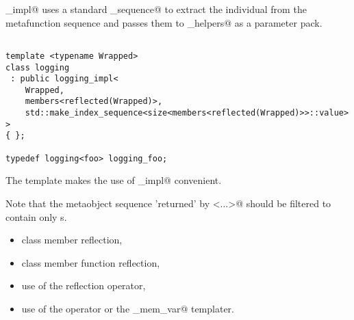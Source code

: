 \verb@logging_impl@ uses a standard \verb@index_sequence@ to extract the
individual  from the metafunction sequence and passes them
to \verb@logging_helpers@ as a parameter pack.


\begin{verbatim}

template <typename Wrapped>
class logging
 : public logging_impl<
	Wrapped,
	members<reflected(Wrapped)>,
	std::make_index_sequence<size<members<reflected(Wrapped)>>::value>
>
{ };

typedef logging<foo> logging_foo;

\end{verbatim}

The \verb@logging@ template makes the use of \verb@logging_impl@ convenient.

Note that the metaobject sequence 'returned' by \verb@members<...>@ should
be filtered to contain only s.

\begin{itemize}
\item{class member reflection,}
\item{class member function reflection,}
\item{use of the reflection operator,}
\item{use of the \verb@identifier@ operator or the \verb@named_mem_var@ templater.}
\end{itemize}

